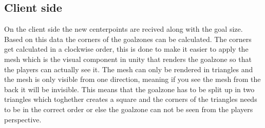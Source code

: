 \subsection{Client side}
On the client side the new centerpoints are recived along with the goal size.
Based on this data the corners of the goalzones can be calculated.
The corners get calculated in a clockwise order, this is done to make it easier to apply the mesh which is the visual component in unity that renders the goalzone so that the players can actually see it.
The mesh can only be rendered in triangles and the mesh is only visible from one direction, meaning if you see the mesh from the back it will be invisible.
This means that the goalzone has to be split up in two triangles which toghether creates a square and the corners of the triangles needs to be in the correct order or else the goalzone can not be seen from the players perspective.